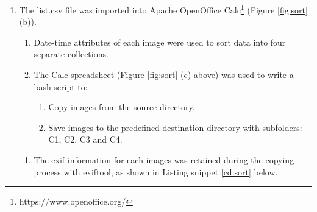 \begin{enumerate}
\begin{enumerate}
\begin{figure}[!htbp]
		\end{figure}
\end{enumerate}
\item The list.csv file was imported into Apache OpenOffice Calc\footnote{https://www.openoffice.org/} (Figure \ref{fig:sort} (b)).
	\begin{enumerate}
	\item Date-time attributes of each image were used to sort data into four separate collections.
	\item The Calc spreadsheet (Figure \ref{fig:sort} (c) above) was used to write a bash script to:
	\begin{enumerate}
	\item Copy images from the source directory.
	\item Save images to the predefined destination directory with subfolders: C1, C2, C3 and C4.
	\end{enumerate}
	\end{enumerate}
\begin{enumerate}
\item The exif information for each images was retained during the copying process with exiftool, as shown in Listing snippet \ref{cd:sort} below.


\end{enumerate}
\end{enumerate}
